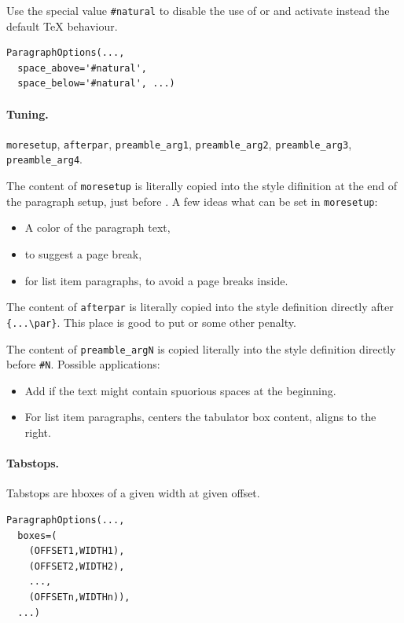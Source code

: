 \documentclass[]{ltugboat}
\begin{document}
Use the special value \verb|#natural| to disable the use of  or  and activate instead the default \TeX{} behaviour.

\begin{verbatim}
ParagraphOptions(...,
  space_above='#natural',
  space_below='#natural', ...)
\end{verbatim}

\paragraph{Tuning.} \verb|moresetup|, \verb|afterpar|, \verb|preamble_arg1|, \verb|preamble_arg2|, \verb|preamble_arg3|, \verb|preamble_arg4|.

The content of \verb|moresetup| is literally copied into the style difinition at the end of the paragraph setup, just before . A few ideas what can be set in \verb|moresetup|:

\begin{itemize}
\item A color of the paragraph text,
\item {} to suggest a page break,
\item {} for list item paragraphs, to avoid a page breaks inside.
\end{itemize}

The content of \verb|afterpar| is literally copied into the style definition directly after \verb|{...\par}|. This place is good to put  or some other penalty.

The content of \verb|preamble_argN| is copied literally into the style definition directly before \verb|#N|. Possible applications:

\begin{itemize}
\item Add  if the text might contain spuorious spaces at the beginning.
\item For list item paragraphs,  centers the tabulator box content,  aligns to the right.
\end{itemize}

\paragraph{Tabstops.} Tabstops are hboxes of a given width at given offset.

\begin{verbatim}
ParagraphOptions(...,
  boxes=(
    (OFFSET1,WIDTH1),
    (OFFSET2,WIDTH2),
    ...,
    (OFFSETn,WIDTHn)),
  ...)
\end{verbatim}
\end{document}
